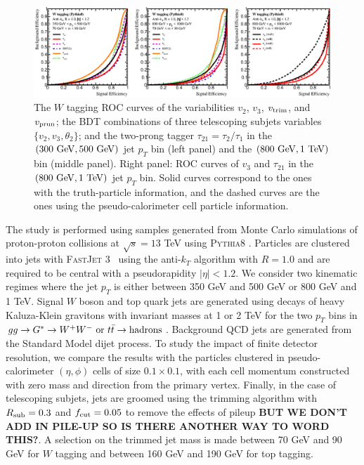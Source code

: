 \documentclass[aps,prl,floatfix,preprintnumbers,twocolumn,groupedaddress,nofootinbib]{revtex4-1}
\begin{document}
\begin{figure}
    \includegraphics[width=2\columnwidth]{plots/W_ROCs_5.eps}
    \caption{The $W$ tagging ROC curves of the variabilities $v_2$, $v_3$, $v_{\rm trim}$, and $v_{\rm prun}$;
    the BDT combinations of three telescoping subjets variables $\{v_2, v_3, \theta_2\}$; and the two-prong tagger $\tau_{21}=\tau_{2}/\tau_{1}$ in the $(300~{\rm GeV}, 500~{\rm GeV})$ jet $p_T$ bin (left panel) and the $(800~{\rm GeV}, 1~{\rm TeV})$ bin (middle panel). Right panel: ROC curves of $v_3$ and $\tau_{21}$ in the $(800~{\rm GeV}, 1~{\rm TeV})$ jet $p_T$ bin. Solid curves correspond to the ones with the truth-particle information, and the dashed curves are the ones using the pseudo-calorimeter cell particle information.}
\label{ROC_W}
\end{figure}

The study is performed using samples generated from Monte Carlo simulations of proton-proton collisions at $\sqrt{s}=13$ TeV using \textsc{Pythia8} \cite{Sjostrand:2007gs}. Particles are clustered into jets with \textsc{FastJet} 3~\cite{Cacciari:2011ma} using the anti-$k_T$ algorithm \cite{Cacciari:2008gp} with $R=1.0$ and are required to be central with a pseudorapidity $|\eta|<1.2$. We consider two kinematic regimes where the jet $p_T$ is either between 350 GeV and 500 GeV or 800 GeV and 1 TeV. Signal $W$ boson and top quark jets are generated using decays of heavy Kaluza-Klein gravitons with invariant masses at 1 or 2 TeV for the two $p_T$ bins in $gg\rightarrow G^*\rightarrow W^+W^-~{\rm or}~t\bar t\rightarrow {\rm hadrons}$. Background QCD jets are generated from the Standard Model dijet process. To study the impact of finite detector resolution, we compare the results with the particles clustered in pseudo-calorimeter $(\eta,\phi)$ cells of size $0.1\times 0.1$, with each cell momentum constructed with zero mass and direction from the primary vertex. Finally, in the case of telescoping subjets, jets are groomed using the trimming algorithm with $R_{\rm sub}=0.3$ and $f_{\rm cut}=0.05$ to remove the effects of pileup \textbf{BUT WE DON'T ADD IN PILE-UP SO IS THERE ANOTHER WAY TO WORD THIS?}. A selection on the trimmed jet mass is made between 70 GeV and 90 GeV for $W$ tagging and between 160 GeV and 190 GeV for top tagging.
\end{document}

